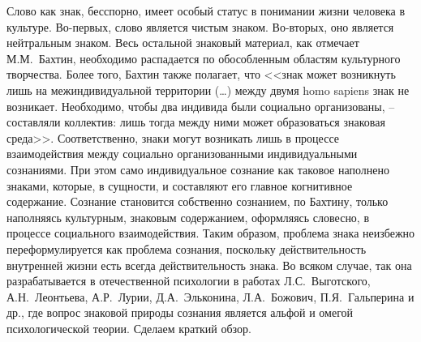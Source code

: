 Слово как знак, бесспорно, имеет особый статус в понимании жизни
человека в культуре. Во-первых, слово является чистым знаком. Во-вторых,
оно является нейтральным знаком. Весь остальной знаковый материал, как
отмечает М.М.~Бахтин, необходимо распадается по обособленным областям
культурного творчества.\autocite{voloshinov1993} Более того,
Бахтин также полагает, что <<знак может возникнуть лишь на
межиндивидуальной территории (\ldots) между двумя homo sapiens знак не
возникает. Необходимо, чтобы два индивида были социально
организованы, -- составляли коллектив: лишь тогда между ними может
образоваться знаковая среда>>.\autocite{voloshinov1993} Соответственно, знаки могут
возникать лишь в процессе взаимодействия между социально
организованными индивидуальными сознаниями. При этом само
индивидуальное сознание как таковое наполнено знаками, которые, в
сущности, и составляют его главное когнитивное содержание. Сознание
становится собственно сознанием, по Бахтину, только наполняясь
культурным, знаковым содержанием, оформляясь словесно, в процессе
социального взаимодействия. Таким образом, проблема знака неизбежно
переформулируется как проблема сознания, поскольку действительность
внутренней жизни есть всегда действительность знака. Во всяком случае,
так она разрабатывается в отечественной психологии в работах Л.С.~Выготского,
А.Н.~Леонтьева, А.Р.~Лурии, Д.А.~Эльконина, Л.А.~Божович,
П.Я.~Гальперина и др., где вопрос знаковой природы сознания является
альфой и омегой психологической теории. Сделаем краткий обзор.

